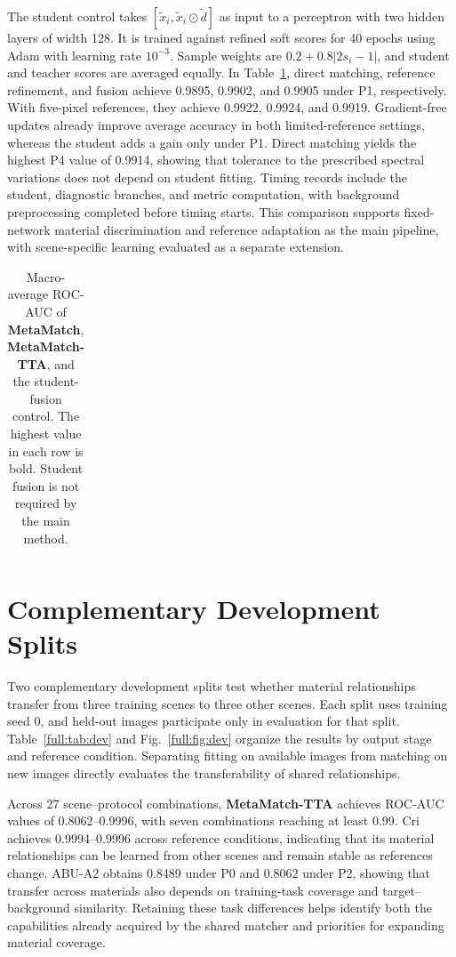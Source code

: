 \documentclass[a4paper,11pt]{article}
\renewcommand{\arraystretch}{1.18}
\newcommand{\method}{\textbf{MetaMatch-TTA}}
\newcommand{\matcher}{\textbf{MetaMatch}}
\begin{document}
The student control takes $[\widetilde x_i,\widetilde x_i\odot\widetilde d]$ as input to a perceptron with two hidden layers of width 128. It is trained against refined soft scores for 40 epochs using Adam with learning rate $10^{-3}$. Sample weights are $0.2+0.8|2s_i-1|$, and student and teacher scores are averaged equally. In Table~\ref{tab:stages}, direct matching, reference refinement, and fusion achieve 0.9895, 0.9902, and 0.9905 under P1, respectively. With five-pixel references, they achieve 0.9922, 0.9924, and 0.9919. Gradient-free updates already improve average accuracy in both limited-reference settings, whereas the student adds a gain only under P1. Direct matching yields the highest P4 value of 0.9914, showing that tolerance to the prescribed spectral variations does not depend on student fitting. Timing records include the student, diagnostic branches, and metric computation, with background preprocessing completed before timing starts. This comparison supports fixed-network material discrimination and reference adaptation as the main pipeline, with scene-specific learning evaluated as a separate extension.
\begin{table}[H]\centering\small\setlength{\tabcolsep}{4pt}
\renewcommand{\arraystretch}{1.02}
\caption{Macro-average ROC-AUC of \textbf{\matcher{}}, \textbf{\method{}}, and the student-fusion control. The highest value in each row is bold. Student fusion is not required by the main method.}\label{tab:stages}
\begin{tabular}{lrrr}\toprule\end{tabular}
\end{table}
\FloatBarrier


\section{Complementary Development Splits}\label{app:development}
Two complementary development splits test whether material relationships transfer from three training scenes to three other scenes. Each split uses training seed 0, and held-out images participate only in evaluation for that split. Table~\ref{full:tab:dev} and Fig.~\ref{full:fig:dev} organize the results by output stage and reference condition. Separating fitting on available images from matching on new images directly evaluates the transferability of shared relationships.

Across 27 scene--protocol combinations, \method{} achieves ROC-AUC values of 0.8062--0.9996, with seven combinations reaching at least 0.99. Cri achieves 0.9994--0.9996 across reference conditions, indicating that its material relationships can be learned from other scenes and remain stable as references change. ABU-A2 obtains 0.8489 under P0 and 0.8062 under P2, showing that transfer across materials also depends on training-task coverage and target--background similarity. Retaining these task differences helps identify both the capabilities already acquired by the shared matcher and priorities for expanding material coverage.
\end{document}
